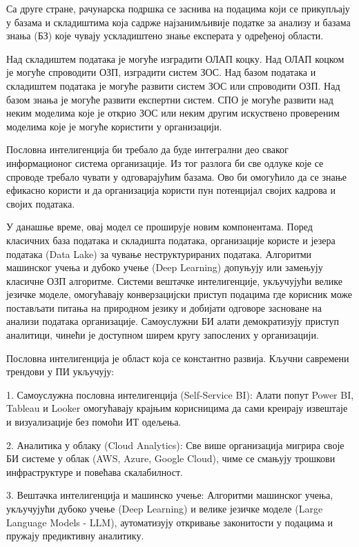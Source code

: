 Са друге стране, рачунарска подршка се заснива на подацима који се прикупљају у базама и складиштима која садрже најзанимљивије податке за анализу и базама знања (БЗ) које чувају ускладиштено знање експерата у одређеној области.

Над складиштем података је могуће изградити ОЛАП коцку. Над ОЛАП коцком је могуће спроводити ОЗП, изградити систем ЗОС. Над базом података и складиштем података је могуће развити систем ЗОС или спроводити ОЗП. Над базом знања је могуће развити експертни систем. СПО је могуће развити над неким моделима које је открио ЗОС или неким другим искуствено провереним моделима које је могуће користити у организацији.

Пословна интелигенција би требало да буде интегрални део сваког информационог система организације. Из тог разлога би све одлуке које се спроводе требало чувати у одговарајућим базама. Ово би омогућило да се знање ефикасно користи и да организација користи пун потенцијал својих кадрова и својих података.

У данашње време, овај модел се проширује новим компонентама. Поред класичних база података и складишта података, организације користе и језера података (Data Lake) за чување неструктурираних података. Алгоритми машинског учења и дубоко учење (Deep Learning) допуњују или замењују класичне ОЗП алгоритме. Системи вештачке интелигенције, укључујући велике језичке моделе, омогућавају конверзацијски приступ подацима где корисник може постављати питања на природном језику и добијати одговоре засноване на анализи података организације. Самоуслужни БИ алати демократизују приступ аналитици, чинећи је доступном ширем кругу запослених у организацији.

Пословна интелигенција је област која се константно развија. Кључни савремени трендови у ПИ укључују:

1. Самоуслужна пословна интелигенција (Self-Service BI): Алати попут Power BI, Tableau и Looker омогућавају крајњим корисницима да сами креирају извештаје и визуализације без помоћи ИТ одељења.

2. Аналитика у облаку (Cloud Analytics): Све више организација мигрира своје БИ системе у облак (AWS, Azure, Google Cloud), чиме се смањују трошкови инфраструктуре и повећава скалабилност.

3. Вештачка интелигенција и машинско учење: Алгоритми машинског учења, укључујући дубоко учење (Deep Learning) и велике језичке моделе (Large Language Models - LLM), аутоматизују откривање законитости у подацима и пружају предиктивну аналитику.

